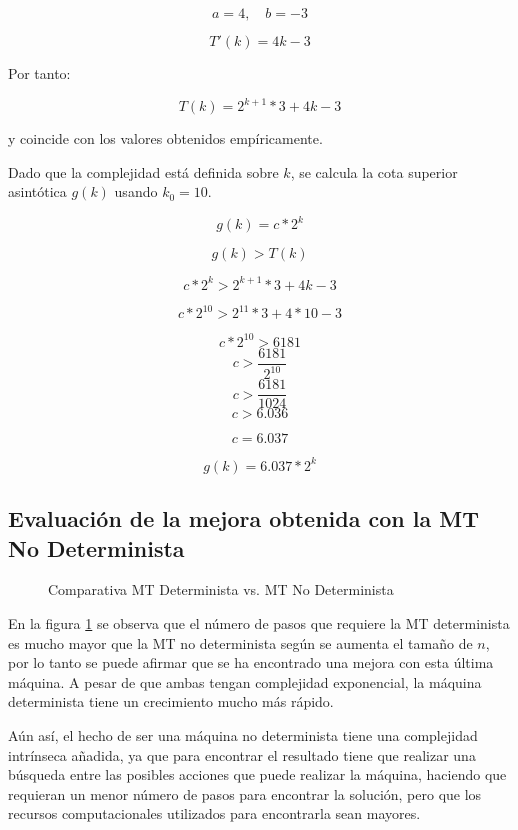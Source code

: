 \documentclass{uc3mpracticas}
\begin{document}
$$ a = 4 , \quad b = -3$$

$$ T'(k) = 4k - 3 $$

Por tanto:

$$ T(k) = 2^{k+1} * 3 + 4k - 3 $$

y coincide con los valores obtenidos empíricamente.

\vspace{2mm}

Dado que la complejidad está definida sobre $k$, se calcula la cota superior asintótica $g(k)$ usando $k_0 = 10$.

$$ g(k) = c*2^k $$

$$ g(k) > T(k) $$

$$ c*2^k > 2^{k+1} * 3 + 4k - 3 $$

$$ c*2^{10} > 2^{11} * 3 + 4*10 - 3 $$

$$ c*2^{10} > 6181 $$
$$ c > \frac{6181}{2^{10}} $$
$$ c > \frac{6181}{1024} $$
$$ c > 6.036 $$

$$ c = 6.037 $$

$$ g(k) = 6.037*2^k $$


\subsection{Evaluación de la mejora obtenida con la MT No Determinista}

\begin{figure}[!h]
  \caption{Comparativa MT Determinista vs. MT No Determinista}
  \label{fig:comparativaMTNoDet}
\end{figure}

En la figura \ref{fig:comparativaMTNoDet} se observa que el número de pasos que requiere la MT determinista es mucho mayor que la MT no determinista según se aumenta el tamaño de $n$, por lo tanto se puede afirmar que se ha encontrado una mejora con esta última máquina. A pesar de que ambas tengan complejidad exponencial, la máquina determinista tiene un crecimiento mucho más rápido.

\vspace{2mm}

Aún así, el hecho de ser una máquina no determinista tiene una complejidad intrínseca añadida, ya que para encontrar el resultado tiene que realizar una búsqueda entre las posibles acciones que puede realizar la máquina, haciendo que requieran un menor número de pasos para encontrar la solución, pero que los recursos computacionales utilizados para encontrarla sean mayores.
\end{document}
